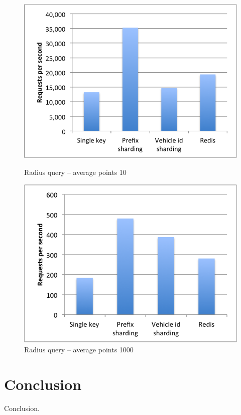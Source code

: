 \documentclass[times, utf8, diplomski]{fer}
\begin{document}
\begin{figure}[h]
\includegraphics[width=\textwidth]{radius_small}
\caption{Radius query -- average points 10}
\label{small_radius}
\endminipage\hfill
{}
\includegraphics[width=\textwidth]{radius_big}
\caption{Radius query -- average points 1000}
\label{big_radius}
\endminipage\hfill
\end{figure}


\chapter{Conclusion}
Conclusion.



\end{document}
